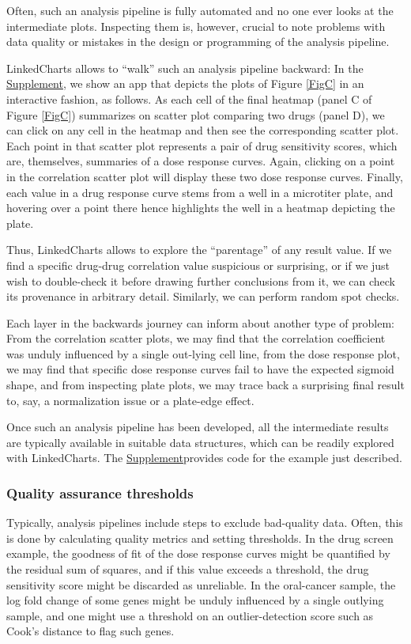 \documentclass[twocolumn,10pt]{article}
\newcommand{\Supplement}{\href{https://anders-biostat.github.io/lc-paper/}{Supplement}}
\begin{document}
Often, such an analysis pipeline is fully automated and no one ever looks at the intermediate plots. Inspecting them is, however, crucial to note problems with data quality or mistakes in the design or programming of the analysis pipeline.

LinkedCharts allows to ``walk'' such an analysis pipeline backward: In the \Supplement, we show an app that depicts the plots of Figure \ref{FigC} in an interactive fashion, as follows. As each cell of the final heatmap (panel C of Figure \ref{FigC}) summarizes on scatter plot comparing two drugs (panel D), we can click on any cell in the heatmap and then see the corresponding scatter plot. Each point in that scatter plot represents a pair of drug sensitivity scores, which are, themselves, summaries of a dose response curves. Again, clicking on a point in the correlation scatter plot will display these two dose response curves. Finally, each value in a drug response curve stems from a well in a microtiter plate, and hovering over a point there hence highlights the well in a heatmap depicting the plate.

Thus, LinkedCharts allows to explore the ``parentage'' of any result value. If we find a specific drug-drug correlation value suspicious or surprising, or if we just wish to double-check it before drawing further conclusions from it, we can check its provenance in arbitrary detail. Similarly, we can perform random spot checks. 

Each layer in the backwards journey can inform about another type of problem: From the correlation scatter plots, we may find that the correlation coefficient was unduly influenced by a single out-lying cell line, from the dose response plot, we may find that specific dose response curves fail to have the expected sigmoid shape, and from inspecting plate plots, we may trace back a surprising final result to, say, a normalization issue or a plate-edge effect.

Once such an analysis pipeline has been developed, all the intermediate results are typically available in suitable data structures, which can be readily explored with LinkedCharts. The \Supplement provides code for the example just described.

\subsubsection{Quality assurance thresholds}

Typically, analysis pipelines include steps to exclude bad-quality data. Often, this is done by calculating quality metrics and setting thresholds. In the drug screen example, the goodness of fit of the dose response curves might be quantified by the residual sum of squares, and if this value exceeds a threshold, the drug sensitivity score might be discarded as unreliable. In the oral-cancer sample, the log fold change of some genes might be unduly influenced by a single outlying sample, and one might use a threshold on an outlier-detection score such as Cook's distance to flag such genes.
\end{document}
